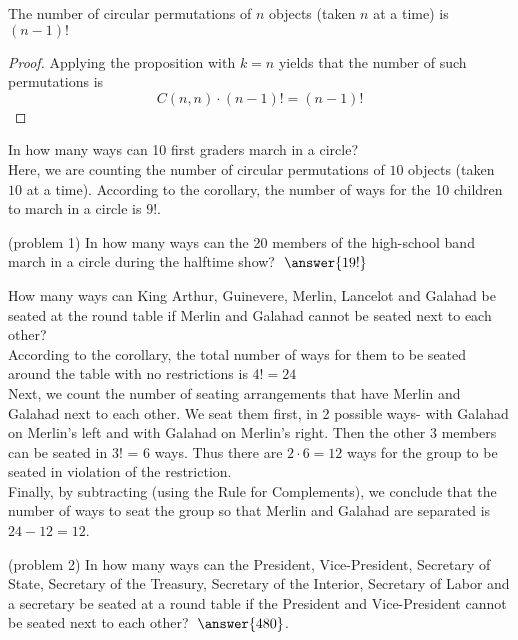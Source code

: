 \documentclass[handout]{ximera}
\begin{document}
\begin{corollary}
The number of circular permutations of $n$ objects (taken $n$ at a time) is $(n-1)!$
\end{corollary}
\begin{proof}
Applying the proposition with $k = n$ yields that the number of such permutations is
\[
C(n,n)\cdot (n-1)! = (n-1)!
\]
\end{proof}

\begin{example}[example 1]
In how many ways can 10 first graders march in a circle?\\
Here, we are counting the number of circular permutations of $10$ 
objects (taken $10$ at a time).
According to the corollary, the number of ways for the 10 children to 
march in a circle is $9!$.
\end{example}


\begin{problem}(problem 1)
In how many ways can the 20 members of the high-school band 
march in a circle during the halftime show? $\; \answer{19!}$
\end{problem}


\begin{example}[example 2]
How many ways can King Arthur, Guinevere, Merlin, Lancelot and Galahad be 
seated at the round table if Merlin and Galahad cannot be seated next to each other?\\
According to the corollary, the total number of ways for 
them to be seated around the table with no restrictions is $4! =24$\\
Next, we count the number of seating arrangements that have Merlin and 
Galahad next to each other.  We seat them first, in 2 possible 
ways- with Galahad on Merlin's left and with Galahad on Merlin's right. 
Then the other 3 members can be seated in 3! = 6 ways.  
Thus there are $2 \cdot 6 = 12$ ways for the group to be seated in 
violation of the restriction.\\
Finally, by subtracting (using the Rule for Complements), we conclude 
that the number of ways to seat the group so that Merlin and Galahad are 
separated is $24-12 = 12$.
\end{example}


\begin{problem}(problem 2)
In how many ways can the President, Vice-President, Secretary of State, 
Secretary of the Treasury, Secretary of the Interior, Secretary of Labor 
and a secretary be seated at a round table if the President and Vice-President 
cannot be seated next to each other? $\; \answer{480}$.

\end{problem}
\end{document}
